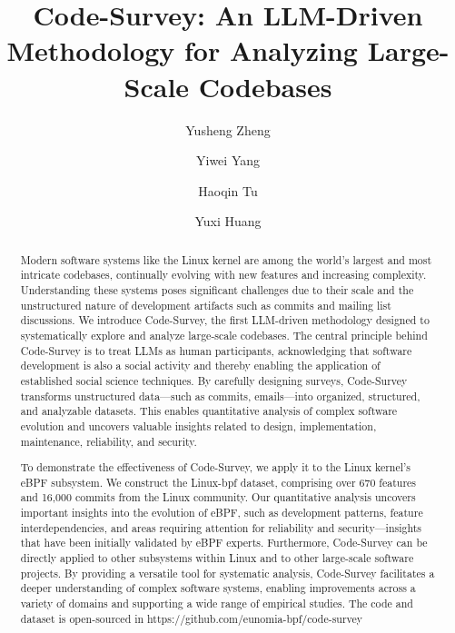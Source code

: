 \documentclass[sigconf,review,anonymous]{acmart}
\author{Yusheng Zheng}
\affiliation{%
  \institution{Eunomia. Inc.}
  \country{USA}
}
\author{Yiwei Yang}
\affiliation{%
  \institution{UC Santa Cruz}
  \country{USA}
}
\author{Haoqin Tu}
\affiliation{%
  \institution{UC Santa Cruz}
  \country{USA}
}
\author{Yuxi Huang}
\affiliation{%
  \institution{Eunomia. Inc.}
  \country{USA}
}
\title{Code-Survey: An LLM-Driven Methodology for Analyzing Large-Scale Codebases}
\begin{document}




\begin{abstract} 

Modern software systems like the Linux kernel are among the world's largest and most intricate codebases, continually evolving with new features and increasing complexity. Understanding these systems poses significant challenges due to their scale and the unstructured nature of development artifacts such as commits and mailing list discussions. We introduce Code-Survey, the first LLM-driven methodology designed to systematically explore and analyze large-scale codebases. The central principle behind Code-Survey is to treat LLMs as human participants, acknowledging that software development is also a social activity and thereby enabling the application of established social science techniques. By carefully designing surveys, Code-Survey transforms unstructured data—such as commits, emails—into organized, structured, and analyzable datasets. This enables quantitative analysis of complex software evolution and uncovers valuable insights related to design, implementation, maintenance, reliability, and security.

To demonstrate the effectiveness of Code-Survey, we apply it to the Linux kernel's eBPF subsystem. We construct the Linux-bpf dataset, comprising over 670 features and 16,000 commits from the Linux community. Our quantitative analysis uncovers important insights into the evolution of eBPF, such as development patterns, feature interdependencies, and areas requiring attention for reliability and security—insights that have been initially validated by eBPF experts. Furthermore, Code-Survey can be directly applied to other subsystems within Linux and to other large-scale software projects. By providing a versatile tool for systematic analysis, Code-Survey facilitates a deeper understanding of complex software systems, enabling improvements across a variety of domains and supporting a wide range of empirical studies. The code and dataset is open-sourced in https://github.com/eunomia-bpf/code-survey
\end{abstract}
\end{document}
